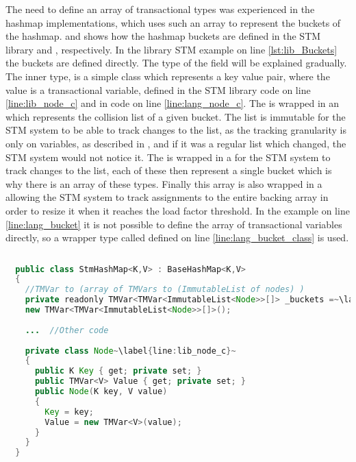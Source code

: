The need to define an array of transactional types was experienced in the hashmap implementations, which uses such an array to represent the buckets of the hashmap.  and  shows how the hashmap buckets are defined in the \ac{STM} library and \stmname, respectively. In the library \ac{STM} example on line \ref{lst:lib_Buckets} the buckets are defined directly. The type of the  field will be explained gradually. The inner  type, is a simple class which represents a key value pair, where the value is a transactional variable, defined in the \ac{STM} library code on line \ref{line:lib_node_c} and in \stmname code on line \ref{line:lang_node_c}. The  is wrapped in an  which represents the collision list of a given bucket. The list is immutable for the \ac{STM} system to be able to track changes to the list, as the tracking granularity is only on variables, as described in , and if it was a regular list which changed, the \ac{STM} system would not notice it. The  is wrapped in a  for the \ac{STM} system to track changes to the list, each of these then represent a single bucket which is why there is an array of these types. Finally this array is also wrapped in a  allowing the \ac{STM} system to track assignments to the entire backing array in order to resize it when it reaches the load factor threshold. In the \stmname example on line \ref{line:lang_bucket} it is not possible to define the array of transactional variables directly, so a wrapper type called  defined on line \ref{line:lang_bucket_class} is used.

\begin{lstlisting}[float,label=lst:lib_Buckets,
  caption={HashMap Buckets Array - \ac{STM} Library},
  language=Java,  
  showspaces=false,
  showtabs=false,
  breaklines=true,
  showstringspaces=false,
  breakatwhitespace=true,
  escapechar=~,
  commentstyle=\color{greencomments},
  keywordstyle=\color{bluekeywords},
  stringstyle=\color{redstrings},
  morekeywords={atomic, retry, orelse, var, get, set, ref, out}]  % Start your code-block
  
  public class StmHashMap<K,V> : BaseHashMap<K,V>
  {
    //TMVar to (array of TMVars to (ImmutableList of nodes) )
    private readonly TMVar<TMVar<ImmutableList<Node>>[]> _buckets =~\label{line:lib_bucket}~
    new TMVar<TMVar<ImmutableList<Node>>[]>();
  
    ...  //Other code
  
    private class Node~\label{line:lib_node_c}~
    {
      public K Key { get; private set; }
      public TMVar<V> Value { get; private set; }
      public Node(K key, V value)
      {
        Key = key;
        Value = new TMVar<V>(value);
      }
    }
  }
\end{lstlisting}

